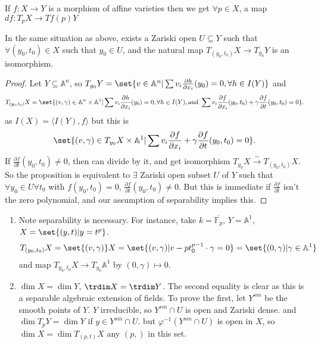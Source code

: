 \documentclass{article}
\newcommand{\A}{\mathbb{A}}
\begin{document}
\begin{ex}
    If $f: X \to Y$ is a morphism of affine varieties then we get $\forall p \in X$, a map $df: T_p X \to T f(p) Y$
\end{ex}
\begin{prop}
    In the same situation as above, exists a Zariski open $U \subseteq Y$ such that $\forall (y_0, t_0) \in X$ such that $y_0 \in U$, and the natural map $T_{(y_0, t_0)} X \to T_{y_0} Y$ is an isomorphism.
\end{prop}
\begin{proof}
    Let $Y \subseteq \A^n$, so $T_{y_0} Y = \set{v \in \A^n | \sum v_i \frac{\partial h}{\partial x_i}(y_0) = 0, \forall h \in I(Y)}$ and
    \begin{equation*}
        T_{(y_0, t_0)} X = \set{(v, \gamma) \in \A^n \times \A^1 | \sum v_i \frac{\partial h}{\partial x_i}(y_0) = 0, \forall h \in I(Y), \text{and } \sum v_i \frac{\partial f}{\partial x_i} (y_0, t_0) + \gamma \frac{\partial f}{\partial t}(y_0, t_0) = 0}.
    \end{equation*}
    as $I(X) = \langle I(Y), f \rangle$ but this is
    \begin{equation*}
        \set{(v, \gamma) \in T_{y_0} X \times \A^1 | \sum v_i \frac{\partial f}{\partial x_i} + \gamma \frac{\partial f}{\partial t}(y_0, t_0) = 0}.
    \end{equation*}
    If $\frac{\partial f}{\partial t}(y_0, t_0) \neq 0$, then can divide by it, and get isomorphism $T_{y_0} X \overset{\sim}{\rightarrow} T_{(y_0, t_0)} X$.
    So the proposition is equivalent to $\exists$ Zariski open subset $U$ of $Y$ such that $\forall y_0 \in U \forall t_0$ with $f(y_0, t_0) = 0$, $\frac{\partial f}{\partial t}(y_0, t_0) \neq 0$.
    But this is immediate if $\frac{\partial f}{\partial t}$ isn't the zero polynomial, and our assumption of separability implies this.
\end{proof}

\begin{enumerate}[label=(\arabic*)]
    \item Note separability is necessary. For instance, take $k = \overline{\mathbb{F}_p}$, $Y = \A^1$, $X = \set{(y, t) | y = t^p}$.
        \begin{equation*}
            T_{(y_0, t_0)} X = \set{(v, \gamma)} X = \set{(v, \gamma) | v - p t_0^{p-1} \cdot \gamma = 0} = \set{(0, \gamma) | \gamma \in \A^1}
        \end{equation*}
        and map $T_{y_0, t_0} X \to T_{y_0} \A^1$ by $(0, \gamma) \mapsto 0$.
    \item $\dim X = \dim Y$, $\trdim X = \trdim Y$. The second equality is clear as this is a separable algebraic extension of fields.
        To prove the first, let $Y^{sm}$ be the smooth points of $Y$. $Y$ irreducible, so $Y^{sm} \cap U$ is open and Zariski dense. and $\dim T_p Y = \dim Y$ if $y \in Y^{sm} \cap U$.
        but $\varphi^{-1} (Y^{sm} \cap U)$ is open in $X$, so $\dim X = \dim T_{(p, t)} X$ any $(p, )$ in this set.
\end{enumerate}
\end{document}
